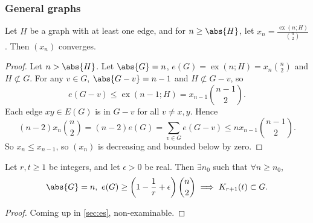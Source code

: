 \documentclass{article}
\DeclareMathOperator{\ext}{ex}
\begin{document}
\subsubsection{General graphs}





\begin{nprop}\label{prop:13}
    Let $H$ be a graph with at least one edge, and for $n \geq \abs{H}$, let $x_n = \frac{\ext(n; H)}{\binom{n}{2}}$. Then $(x_n)$ converges.
\end{nprop}
\begin{proof}
    Let $n > \abs{H}$. Let $\abs{G} = n$, $e(G) = \ext(n; H) = x_n \binom{n}{2}$ and $H \not\subset G$.
    For any $v \in G$, $\abs{G - v} = n-1$ and $H \not\subset G - v$, so
    \begin{equation*}e(G-v) \leq \ext(n-1; H) = x_{n-1} \binom{n-1}{2}.\end{equation*}
    Each edge $xy \in E(G)$ is in $G-v$ for all $v \neq x, y$.
    Hence \begin{equation*}(n-2) x_n \binom{n}{2} = (n-2) e(G) = \sum_{v \in G} e(G-v) \leq n x_{n-1} \binom{n-1}{2}.\end{equation*}
    So $x_n \leq x_{n-1}$, so $(x_n)$ is decreasing and bounded below by zero.
\end{proof}




\begin{nthm}\label{thm:14}
    Let $r, t \geq 1$ be integers, and let $\epsilon > 0$ be real.
    Then $\exists n_0$ such that $\forall n \geq n_0$,
    \begin{equation*}
        \abs{G} = n,\ e(G) \geq \left(1 - \frac{1}{r} + \epsilon\right) \binom{n}{2} \implies K_{r+1}(t) \subset G.
    \end{equation*}
\end{nthm}
\begin{proof}
    Coming up in \cref{sec:es}, non-examinable.
\end{proof}
\end{document}
